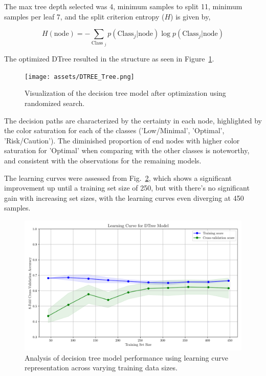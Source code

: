 \documentclass[conference]{IEEEtran}
\begin{document}
The max tree depth selected was 4, minimum samples to split 11, minimum samples per leaf 7, and the split criterion entropy ($H$) is given by,

$$H(\text{node}) = - \sum_{\text{Class }_j} p(\text{Class}_j | \text{node}) \log p(\text{Class}_j | \text{node})$$

The optimized DTree resulted in the structure as seen in Figure~\ref{dtree_tree}.

\begin{figure}[H]
    \centering
    \texttt{[image: assets/DTREE\_Tree.png]}
    \caption{Visualization of the decision tree model after optimization using randomized search.}
    \label{dtree_tree}
\end{figure} %

The decision paths are characterized by the certainty in each node, highlighted by the color saturation for each of the classes ('Low/Minimal', 'Optimal', 'Risk/Caution'). The diminished proportion of end nodes with higher color saturation for 'Optimal' when comparing with the other classes is noteworthy, and consistent with the observations for the remaining models.

The learning curves were assessed from Fig.~\ref{dtree_lcurve}, which shows a significant improvement up until a training set size of 250, but with there's no significant gain with increasing set sizes, with the learning curves even diverging at 450 samples.

\begin{figure}[H]
    \centering
    \includegraphics[width=1\linewidth]{assets/DTREE_LearningCurve.png}
    \caption{Analysis of decision tree model performance using learning curve representation across varying training data sizes.}
    \label{dtree_lcurve}
\end{figure} %
\end{document}
